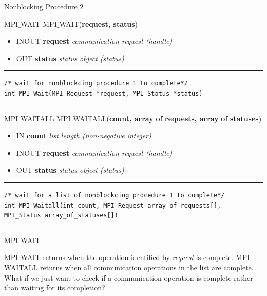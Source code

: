 \documentclass[xcolor=dvipsnames]{beamer}
\begin{document}
\begin{frame}[fragile]{Nonblocking Procedure 2}
\begin{block}{MPI$\_$WAIT}
MPI$\_$WAIT(\textbf{request, status})
\\
\begin{itemize}
\item[] INOUT \textbf{request} \: \textit{communication request (handle)}
\item[] OUT   \textbf{status} \: \textit{status object (status)}
\end{itemize}
\end{block}

\rule{\textwidth}{1pt}
\scriptsize
\begin{verbatim}
/* wait for nonblockcing procedure 1 to complete*/
int MPI_Wait(MPI_Request *request, MPI_Status *status)
\end{verbatim}
\rule{\textwidth}{1pt}

\begin{block}{MPI$\_$WAITALL}
MPI$\_$WAITALL(\textbf{count, array$\_$of$\_$requests, array$\_$of$\_$statuses})
\\
\begin{itemize}
\item[] IN \textbf{count} \: \textit{list length (non-negative integer)}
\item[] INOUT \textbf{request} \: \textit{communication request (handle)}
\item[] OUT   \textbf{status} \: \textit{status object (status)}
\end{itemize}
\end{block}
\rule{\textwidth}{1pt}
\scriptsize
\begin{verbatim}
/* wait for a list of nonblockcing procedure 1 to complete*/
int MPI_Waitall(int count, MPI_Request array_of_requests[],
MPI_Status array_of_statuses[])
\end{verbatim}
\rule{\textwidth}{1pt}
\end{frame}


\begin{frame}{MPI$\_$WAIT}
\begin{outline}
\1 MPI$\_$WAIT returns when the operation identified by \textit{request} is complete.
\1 MPI$\_$WAITALL returns when all communication operations in the list are complete.
\1 What if we just want to check if a communication operation is complete rather than waiting for its completion?
\end{outline}    
\end{frame}
\end{document}
